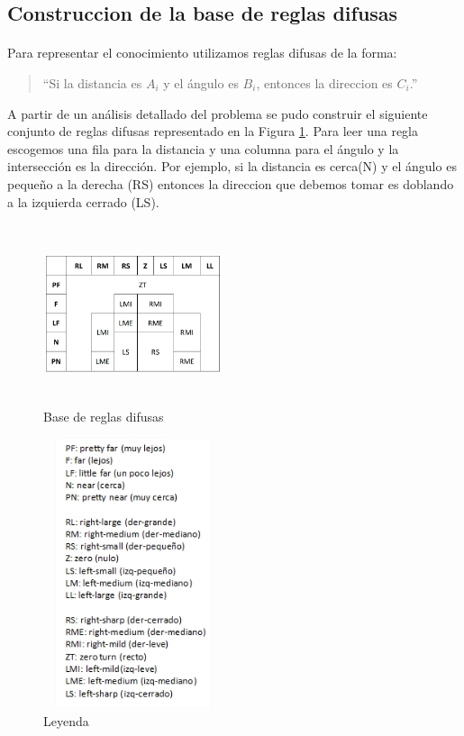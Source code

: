 \documentclass[a4paper,10pt]{article}
\begin{document}
\subsection{Construccion de la base de reglas difusas}\label{sub:fuzzy_rule_base}
	\paragraph{} Para representar el conocimiento  utilizamos reglas difusas de la forma:
	
	\begin{quote}
		``Si la distancia es $A_{i}$ y el ángulo es $B_{i}$, entonces la direccion es $C_{i}$.''
	\end{quote}
	
		A partir de un análisis detallado del problema se pudo construir el siguiente conjunto de reglas difusas representado en la Figura \ref{fig:fuzzy_rule_base}.
	Para leer una regla escogemos una fila para la distancia y una columna para el ángulo y la intersección es la dirección. Por ejemplo, si la distancia es cerca(N) y el ángulo 		es pequeño a la derecha (RS) entonces la direccion que debemos tomar es doblando a la izquierda cerrado (LS). 
	
	\begin{figure}[htb]%
		\begin{center}
			\includegraphics[width=200px, height=200px]{images/fuzzy_rule_base.jpg}
		\end{center}
		\caption{Base de reglas difusas \label{fig:fuzzy_rule_base}}%
	\end{figure}
	
	\begin{figure}[htb]%
		\begin{center}
			\includegraphics[width=200px, height=300px]{images/terms_legend.jpg}
		\end{center}
		\caption{Leyenda \label{fig:terms_legend}}%
	\end{figure}
	
\end{document}
